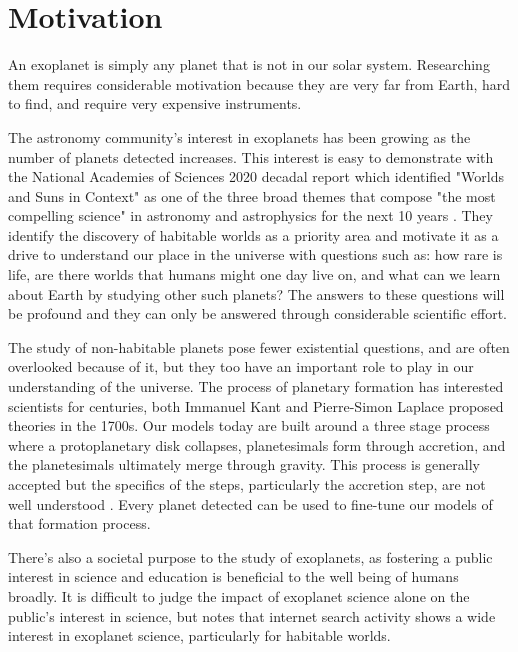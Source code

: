 \section{Motivation}
\label{sec:motivation}

An exoplanet is simply any planet that is not in our solar system. Researching
them requires considerable motivation because they are very far from Earth,
hard to find, and require very expensive instruments. 

The astronomy community's interest in exoplanets has been growing as the number
of planets detected increases. This interest is easy to demonstrate with the
National Academies of Sciences 2020 decadal report which identified "Worlds and
Suns in Context" as one of the three broad themes that compose "the most
compelling science" in astronomy and astrophysics for the next 10 years
\citep{nationalacademiesofsciencesPathwaysDiscoveryAstronomy2021}. They
identify the discovery of habitable worlds as a priority area and motivate it
as a drive to understand our place in the universe with questions such as: how
rare is life, are there worlds that humans might one day live on, and what can we
learn about Earth by studying other such planets? The answers to these questions
will be profound and they can only be answered through considerable scientific
effort.

The study of non-habitable planets pose fewer existential questions, and are
often overlooked because of it, but they too have an important role to play in
our understanding of the universe. The process of planetary formation has
interested scientists for centuries, both Immanuel Kant and Pierre-Simon
Laplace proposed theories \citep{Perryman2018a} in the 1700s. Our models today
are built around a three stage process where a protoplanetary disk collapses,
planetesimals form through accretion, and the planetesimals ultimately merge
through gravity\citep{Jeffery}. This process is generally accepted but the
specifics of the steps, particularly the accretion step, are not well
understood \citep{Perryman2018a}. Every planet detected can be used to
fine-tune our models of that formation process.

There's also a societal purpose to the study of exoplanets, as fostering a
public interest in science and education is beneficial to the well being of
humans broadly. It is difficult to judge the impact of exoplanet science alone
on the public's interest in science, but \citet{deegImpactExoplanet2018} notes
that internet search activity shows a wide interest in exoplanet science,
particularly for habitable worlds.

